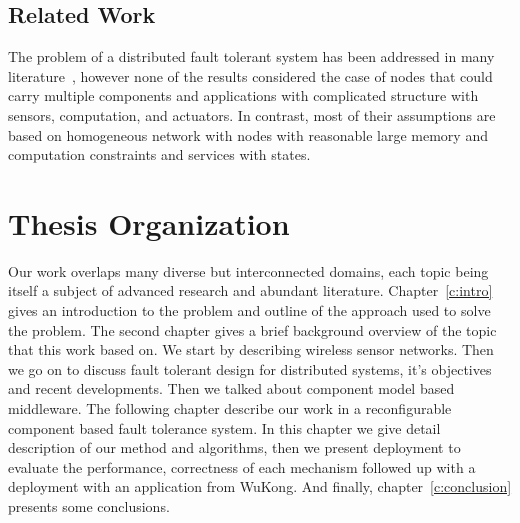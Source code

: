 \subsection{Related Work}

The problem of a distributed fault tolerant system has been addressed in many
literature~\cite{Neumann2010,Lamport2001,Luna2008,Liu2009,Sussman2000,Lynch2002},
however none of the results considered the case of nodes that could carry
multiple components and applications with complicated structure with sensors,
computation, and actuators. In contrast, most of their assumptions
are based on homogeneous network with nodes with reasonable large memory and computation constraints and services with states.

\section{Thesis Organization}

Our work overlaps many diverse but interconnected domains, each topic being 
itself a subject of advanced research and abundant literature.
Chapter~\ref{c:intro} gives an introduction to the problem and outline of the
approach used to solve the problem. The second chapter
gives a brief background overview of the topic that this work based on. 
We start by describing wireless sensor networks. Then we go on to discuss fault
tolerant design for distributed systems, it's objectives and recent
developments. Then we talked about component model based middleware. The
following chapter describe our work in a reconfigurable component based fault
tolerance system. In this chapter we give detail description of our method and
algorithms, then we present deployment to evaluate the performance,
correctness of each mechanism followed up with a deployment with an application
from WuKong. And finally, chapter~\ref{c:conclusion} presents some conclusions.

